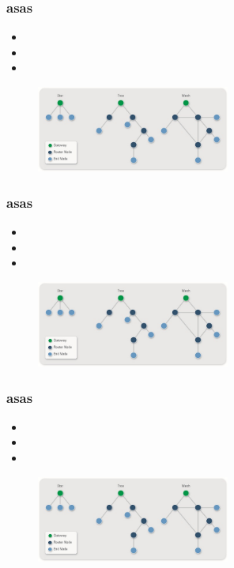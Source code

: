 \documentclass{beamer}
\begin{document}
\begin{frame}
\frametitle{asas}
\begin{itemize}
\item 
\item 
\item 
\end{itemize}
\begin{figure}[!h]
\centering
\includegraphics[width=2.5in]{topologias}
\end{figure}
\end{frame}

\begin{frame}
\frametitle{asas}
\begin{itemize}
\item 
\item 
\item 
\end{itemize}
\begin{figure}[!h]
\centering
\includegraphics[width=2.5in]{topologias}
\end{figure}
\end{frame}

\begin{frame}
\frametitle{asas}
\begin{itemize}
\item 
\item 
\item 
\end{itemize}
\begin{figure}[!h]
\centering
\includegraphics[width=2.5in]{topologias}
\end{figure}
\end{frame}
\end{document}
